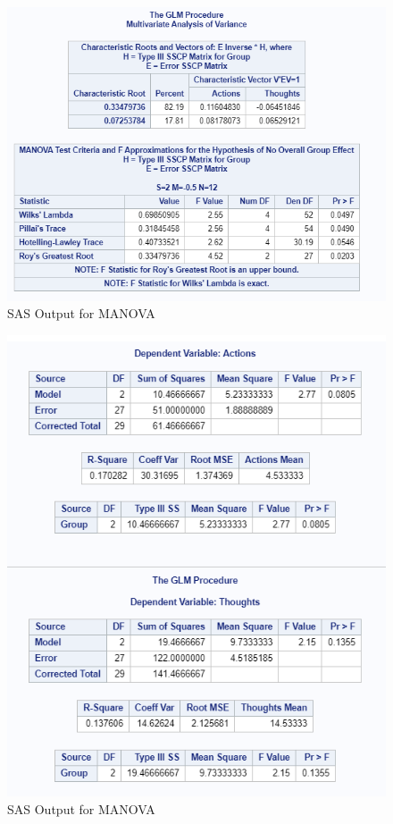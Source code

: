 \documentclass[
]{book}
\begin{document}
\begin{figure}[!h]
\includegraphics{Screenshots/MANOVA/MANOVAsas} \caption{\label{fig:manovaSAS}SAS Output for MANOVA}\label{fig:manovaSAS}
\end{figure}

\begin{figure}[!h]
\includegraphics{Screenshots/MANOVA/ANOVASsas} \caption{\label{fig:manovaSAS2}SAS Output for MANOVA}\label{fig:manovaSAS2}
\end{figure}
\end{document}
